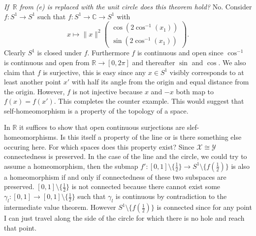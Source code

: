 \documentclass[letter]{article}
\newenvironment{menumerate}{%
  \edef\backupindent{\the\parindent}%
  \enumerate%
  \setlength{\parindent}{\backupindent}%
}{\endenumerate}
\begin{document}
\begin{menumerate}
\begin{menumerate}
		 		\item \emph{If $\ \mathbb{R}$ from (e) is replaced with the unit circle does this theorem hold?} No. Consider $f: S^1 \to S^1$ such that $f:S^1 \to \mathbb{C} \to S^1$ with
		 		 \begin{equation*}
		 		 	x \mapsto \|x\|^2\left(
		 		 	\begin{array}{c}
		 		 		\cos(2\cos^{-1}(x_1)) \\
		 		 		\sin(2\cos^{-1}(x_1))
		 		 	\end{array}\right).
	 		 	\end{equation*}
	 		 	Clearly $S^1$ is closed under $f$. Furthermore $f$ is continuous and open since $\cos^{-1}$ is continuous and open from $\mathbb{R} \to [0,2\pi]$ and thereafter $\sin$ and $\cos.$ We also claim that $f$ is surjective, this is easy since any $x \in S^1$ visibly corresponds to at least another point $x'$ with half its angle from the origin and equal distance from the origin. However, $f$ is not injective because $x$ and $-x$ both map to $f(x)=f(x')$. This completes the counter example.
	 		 	This would suggest that self-homeomorphism is a property of the topology of a space.

	 		 	 In $\mathbb{R}$ it suffices to show that open continuous surjections are slef-homeomorphisms. Is this itself a property of the line or is there something else occuring here. For which spaces does this property exist? Since $\mathcal{X} \cong \mathcal{Y}$ connectedness is preserved. In the case of the line and the circle, we could try to assume a homeomorphism, then the submap $f':[0,1] \setminus \{\frac{1}{2}\} \to S^1 \setminus \{f(\frac{1}{2})\}$ is also a homeomorphism if and only if connectedness of these two subspaces are preserved. $[0,1] \setminus \{\frac12\}$ is not connected because there cannot exist some $\gamma_l :[0,1] \to [0,1] \setminus \{\frac12\}$ such that $\gamma_l$ is continuous by contradiction to the intermediate value theorem. However $S^1 \setminus \{f(\frac12)\}$ is connected since for any point I can just travel along the side of the circle for which there is no hole and reach that point.
		 	\end{menumerate}
 	\end{menumerate}
\end{document}
